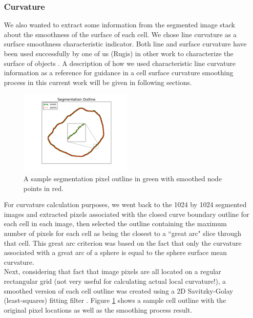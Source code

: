 \documentclass[a4paper,10pt]{article}
\begin{document}
\subsubsection{Curvature}

We also wanted to extract some information from the segmented image stack about the smoothness of the surface of each cell. We chose line curvature as a surface smoothness characteristic indicator. Both line and surface curvature have been used successfully  by one of us (Rugis) in other work to characterize the surface of objects \cite{Rugis_2005_SCMMD, Rugis_2006_SRMRSD, Rugis_2006_SISCE}. A description of how we used characteristic line curvature information as a reference for guidance in a cell surface curvature smoothing process in this current work will be given in following sections.\\

\begin{figure}[H]
\begin{center}
\includegraphics[width=0.5\textwidth]{images/outline.pdf}
\end{center}
\vspace{-5mm}
\caption{A sample segmentation pixel outline in green with smoothed node points in red.}
\label{fig:slice_outline}
\end{figure}

For curvature calculation purposes, we went back to the 1024 by 1024 segmented images and extracted pixels associated with the closed curve boundary outline for each cell in each  image, then selected the outline containing the maximum number of pixels for each cell as being the closest to a ``great arc" slice through that cell. This great arc criterion was based on the fact that only the curvature associated with a great arc of a sphere is equal to the sphere surface mean curvature.\\

Next, considering that fact that image pixels are all located on a regular rectangular grid (not very useful for calculating actual local curvature!), a smoothed version of each cell outline was created using a 2D Savitzky-Golay (least-squares) fitting filter \cite{doi:10.1021/ac60214a047}. Figure \ref{fig:slice_outline} shows a sample cell outline with the original pixel locations as well as the smoothing process result.\\
\end{document}
